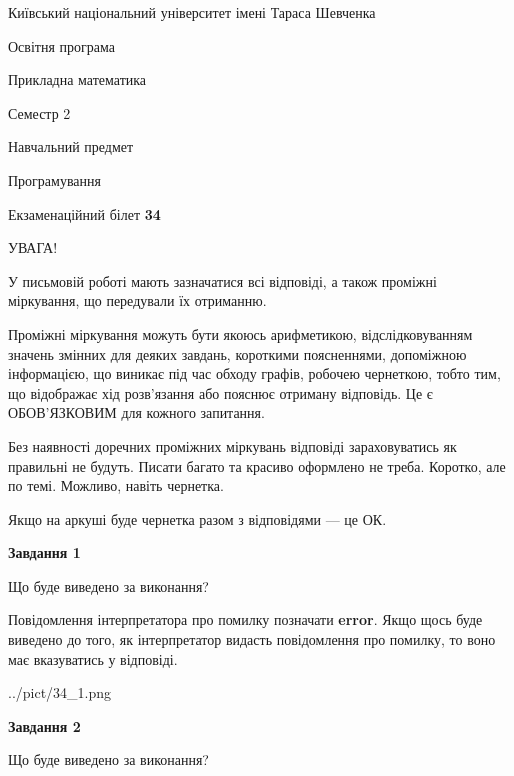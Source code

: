 \documentclass[12pt, ukrainian]{article}
\begin{document}
{{\begin {small}\par
{ \center  Київський національний університет імені Тараса Шевченка \par}
{\parbox {5 cm}{Освітня програма \hfill}{\parbox {7 cm}{Прикладна математика \hfill}}\parbox {6 cm}{\hfill Семестр 2}}\par
{\parbox {5 cm} {Навчальний предмет \hfill}\parbox {7 cm}{Програмування \hfill}\parbox {6cm}{\hfill}\par}\vspace{-7pt} \end{small}}{\center Екзаменаційний білет \No \textbf
{ 34 }\par}}
{
\begin {large}
УВАГА!

У письмовій роботі мають зазначатися всі відповіді, а також проміжні міркування, що передували їх отриманню.

Проміжні міркування можуть бути якоюсь арифметикою, відслідковуванням зна\-чень змінних для деяких завдань,
короткими поясненнями, допоміжною інформацією, що виникає під час обходу графів, робочею чернеткою,
тобто тим, що відображає хід розв’язання або пояснює отриману відповідь.
Це є ОБОВ’ЯЗКОВИМ для кожного запитання.

Без наявності доречних проміжних міркувань відповіді зараховуватись як правиль\-ні не будуть.
Писати багато та красиво оформлено не треба. Коротко, але по темі. Можли\-во, навіть чернетка.

Якщо на аркуші буде чернетка разом з відповідями --- це ОК.

\newpage

{\begin {center}\textbf{Завдання 1}\end {center}}\par
Що буде виведено за виконання?

Повідомлення інтерпретатора про помилку позначати \textbf{error}.
Якщо щось буде виведено до того, як інтерпретатор видасть повідомлення про помилку, 
то воно має вказуватись у відповіді. \par


\begin{center}
	{../pict/34_1.png}
\end{center}
\newpage

{\begin {center}\textbf{Завдання 2}\end {center}}\par
Що буде виведено за виконання?


\end{large}}
\end{document}
